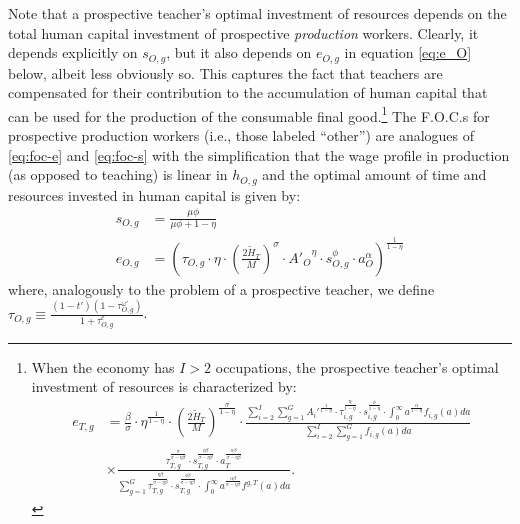 \documentclass[onehalfspacing,11pt]{article}
\begin{document}
Note that a prospective teacher's optimal investment of resources depends on the total human capital investment of prospective {\it production} workers. Clearly, it depends explicitly on $s_{O,g}$, but it also depends on $e_{O,g}$ in equation \eqref{eq:e_O} below, albeit less obviously so. This captures the fact that teachers are compensated for their contribution to the accumulation of human capital that can be used for the production of the consumable final good.\footnote{When the economy has $I>2$ occupations, the prospective teacher's optimal investment of resources is characterized by:
\begin{align*}
e_{T,g} & = \tfrac{\beta}{\sigma}\cdot\eta^{\frac{1}{1-\eta}}\cdot \left(\tfrac{2\widetilde{H}_T}{M}\right)^{\frac{\sigma}{1-\eta}} \cdot \frac{\sum_{i=2}^I \sum_{g=1}^G {A_i'}^\frac{1}{1-\eta}\cdot\tau_{i,g}^\frac{\eta}{1-\eta} \cdot s_{i,g}^\frac{\phi}{1-\eta}\cdot \int_0^\infty a^{\frac{\alpha}{1-\eta}} f_{i,g}(a)da}{\sum_{i=2}^I \sum_{g=1}^G f_{i,g}(a)da} \nonumber\\
& \times \frac{\tau_{T,g}^\frac{\sigma}{\sigma-\eta\beta } \cdot s_{T,g}^\frac{\phi\beta }{\sigma-\eta\beta } \cdot a_T^\frac{\alpha\beta }{\sigma-\eta\beta }}{\sum_{g=1}^G \tau_{T,g}^\frac{\eta\beta }{\sigma-\eta\beta } \cdot s_{T,g}^\frac{\phi\beta }{\sigma-\eta\beta } \cdot \int_0^\infty a^\frac{\alpha\beta}{\sigma-\eta\beta } f^{g,T}(a)da}.
\end{align*}
}
The F.O.C.s for prospective production workers (i.e., those labeled ``other'') are analogues of \eqref{eq:foc-e} and \eqref{eq:foc-s} with the simplification that the wage profile in production (as opposed to teaching) is linear in $h_{O,g}$ and the optimal amount of time and resources invested in human capital is given by:
\begin{align}
s_{O,g} & = \frac{\mu \phi}{\mu \phi+1-\eta} \\
\label{eq:e_O}
e_{O,g} & = \left( \tau_{O,g} \cdot \eta \cdot \left(\tfrac{2\widetilde{H}_T}{M}\right)^\sigma\cdot {A'_{O}}^\eta \cdot s_{O,g}^\phi \cdot a_O^\alpha \right)^{\frac{1}{1-\eta}}
\end{align}
where, analogously to the problem of a prospective teacher, we define $\tau_{O,g} \equiv \frac{\left( 1-t' \right) \left( 1-\tau^{\omega '}_{O,g} \right)}{1+\tau^e_{O,g}}$.
\end{document}

